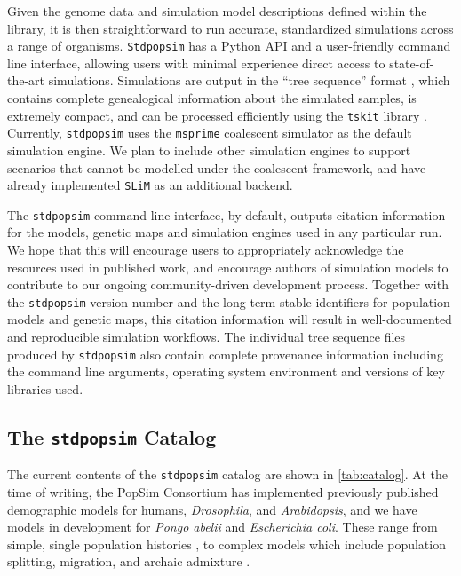 \documentclass[12pt,halfline,a4paper]{ouparticle}
\newcommand{\Stdpopsim}{\texttt{Stdpopsim}\xspace}
\newcommand{\stdpopsim}{\texttt{stdpopsim}\xspace}
\newcommand{\tskit}{\texttt{tskit}\xspace}
\begin{document}
Given the genome data and simulation model descriptions defined within the
library, it is then straightforward to run accurate, standardized simulations
across a range of organisms. \Stdpopsim has a Python API and a user-friendly
command line interface, allowing users with minimal experience direct access to
state-of-the-art simulations. Simulations are output in the ``tree sequence''
format \citep{kelleher2016efficient,kelleher2018efficient,kelleher2019inferring}, which
contains complete genealogical information about the simulated samples, is
extremely compact, and can be processed efficiently using the \tskit library
\citep{kelleher2016efficient,kelleher2018efficient}. Currently,
\stdpopsim uses the  \texttt{msprime} coalescent simulator \citep{kelleher2016efficient}
as the default simulation engine. We plan to include other simulation
engines to support scenarios that cannot be modelled under the coalescent framework,
and have already implemented \texttt{SLiM} \citep{haller2019tree,haller2019slim} as
an additional backend.

The \stdpopsim command line interface, by default, outputs citation information
for the models, genetic maps and simulation engines used in any particular run.
We hope that this will encourage users to appropriately acknowledge the
resources used in published work, and encourage authors
of simulation models to contribute to our ongoing community-driven development process.
Together with the \stdpopsim version number and the long-term stable identifiers
for population models and genetic maps,
this citation information will result in well-documented and reproducible
simulation workflows. The individual tree sequence files produced by
\stdpopsim also contain complete provenance information including the command
line arguments, operating system environment and versions of key libraries
used.

\subsection*{The \stdpopsim Catalog}
The current contents of the \stdpopsim catalog are shown in \autoref{tab:catalog}. At the time of
writing, the PopSim Consortium has implemented previously published demographic models for
humans, \emph{Drosophila}, and \emph{Arabidopsis}, 
and we have models in development for \emph{Pongo abelii} and \emph{Escherichia coli}.
These range from
simple, single population histories \cite[e.g.,][]{sheehan2016deep},
to complex models which include population splitting, migration, and archaic
admixture \cite[e.g.,][]{ragsdale2019models}.
\end{document}

